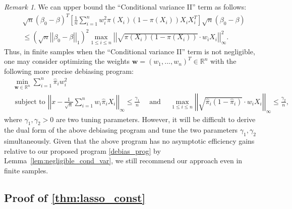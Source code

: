 \documentclass[ejsv2,noshowframe]{imsart}
\theoremstyle{plain}
\theoremstyle{definition}
\theoremstyle{remark}
\newtheorem{remark}{Remark}
\newcommand{\norm}[1]{\left|\left| #1 \right|\right|}
\renewcommand{\hat}{\widehat}
\begin{document}
\begin{remark}
	We can upper bound the ``Conditional variance II'' term as follows:
	\begin{align*}
		&\sqrt{n}\left(\beta_0 - \beta\right)^T \left[\frac{1}{n}\sum_{i=1}^n w_i^2\pi(X_i)\left(1-\pi(X_i)\right)X_iX_i^T \right] \sqrt{n}\left(\beta_0 - \beta\right) \\
		&\leq \left(\sqrt{n} \norm{\beta_0-\beta}_1 \right)^2 \max_{1\leq i \leq n}\norm{\sqrt{\pi(X_i)\left(1-\pi(X_i)\right)} \cdot w_i X_i}_{\infty}^2.
	\end{align*}
	Thus, in finite samples when the ``Conditional variance II'' term is not negligible, one may consider optimizing the weights $\bm{w}=(w_1,...,w_n)^T\in \mathbb{R}^n$ with the following more precise debiasing program:
	\begin{align*}
		&\min_{\bm{w} \in \mathbb{R}^n} \sum_{i=1}^n \hat{\pi}_iw_i^2 \\
		&\text{ subject to } \norm{x- \frac{1}{\sqrt{n}}\sum_{i=1}^n w_i \hat{\pi}_i X_i }_{\infty} \leq \frac{\gamma_1}{n} \quad\text{ and }\quad \max_{1\leq i \leq n}\norm{\sqrt{\hat{\pi}_i\left(1-\hat{\pi}_i\right)} \cdot w_i X_i}_{\infty} \leq \frac{\gamma_2}{n},
	\end{align*}
	where $\gamma_1,\gamma_2>0$ are two tuning parameters. However, it will be difficult to derive the dual form of the above debiasing program and tune the two parameters $\gamma_1,\gamma_2$ simultaneously. Given that the above program has no asymptotic efficiency gains relative to our proposed program \eqref{debias_prog} by Lemma~\ref{lem:negligible_cond_var}, we still recommend our approach even in finite samples.
\end{remark}

\subsection{Proof of \autoref{thm:lasso_const}}
\label{subapp:proof_consistency}
\end{document}
